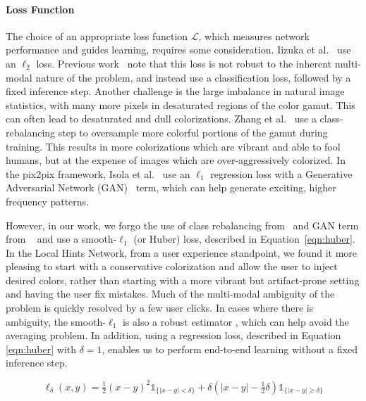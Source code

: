 \documentclass[acmtog,authorversion]{acmart}
\begin{document}
\paragraph{Loss Function} The choice of an appropriate loss function $\mathcal{L}$, which measures network performance and guides learning, requires some consideration. Iizuka et al.~ use an $\ell_2$ loss. Previous work~\cite{zhang2016colorful,larsson2016learning,charpiat2008automatic} note that this loss is not robust to the inherent multi-modal nature of the problem, and instead use a classification loss, followed by a fixed inference step. Another challenge is the large imbalance in natural image statistics, with many more pixels in desaturated regions of the color gamut. This can often lead to desaturated and dull colorizations. Zhang et al.~ use a class-rebalancing step to oversample more colorful portions of the gamut during training. This results in more colorizations which are vibrant and able to fool humans, but at the expense of images which are over-aggressively colorized. In the pix2pix framework, Isola et al.~ use an $\ell_1$ regression loss with a Generative Adversarial Network (GAN)~\cite{goodfellow2014generative} term, which can help generate exciting, higher frequency patterns.

However, in our work, we forgo the use of class rebalancing from~\cite{zhang2016colorful} and GAN term from ~\cite{isola2016image} and use a smooth-$\ell_1$ (or Huber) loss, described in Equation~\ref{eqn:huber}. In the Local Hints Network, from a user experience standpoint, we found it more pleasing to start with a conservative colorization and allow the user to inject desired colors, rather than starting with a more vibrant but artifact-prone setting and having the user fix mistakes. Much of the multi-modal ambiguity of the problem is quickly resolved by a few user clicks. In cases where there is ambiguity, the smooth-$\ell_1$ is also a robust estimator \cite{huber1964robust}, which can help avoid the averaging problem. In addition, using a regression loss, described in Equation \ref{eqn:huber} with $\delta=1$, enables us to perform end-to-end learning without a fixed inference step.

\vspace{-2mm}
\begin{equation}
\ell_{\delta}(x,y) = 
\tfrac{1}{2}(x-y)^2 \mathds{1}_{\big\{ |x-y|< \delta \big\} }
+ \delta(|x-y|-\tfrac{1}{2}\delta) \mathds{1}_{\big\{ |x-y|\geq \delta \big\} }
\label{eqn:huber}
\end{equation}
\vspace{-1mm}
\end{document}
